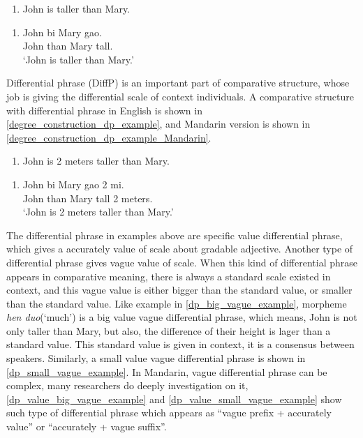 \documentclass{ctexart}
\let \cite \parencite
\begin{document}
\begin{enumerate}
    \item \label{degree_construction_example}
    John is taller than Mary.
\end{enumerate}

\begin{enumerate}
    \item \label{degree_construction_example_Mandarin}
    John bi Mary gao.  \\
    John than Mary tall. \\
    `John is taller than Mary.'
\end{enumerate}

Differential phrase (DiffP) is an important part of comparative structure, whose job is giving the differential scale of context individuals. A comparative structure with differential phrase in English is shown in \ref{degree_construction_dp_example}, and Mandarin version is shown in \ref{degree_construction_dp_example_Mandarin}.

\begin{enumerate}
    \item \label{degree_construction_dp_example}
    John is 2 meters taller than Mary.
\end{enumerate}

\begin{enumerate}
    \item \label{degree_construction_dp_example_Mandarin}
    John bi Mary gao 2 mi.  \\
    John than Mary tall 2 meters. \\
    `John is 2 meters taller than Mary.'
\end{enumerate}

The differential phrase in examples above are specific value differential phrase, which gives a accurately value of scale about gradable adjective. Another type of differential phrase gives vague value of scale. When this kind of differential phrase appears in comparative meaning, there is always a standard scale existed in context, and this vague value is either bigger than the standard value, or smaller than the standard value. Like example in \ref{dp_big_vague_example}, morpheme \textit{hen duo}(`much') is a big value vague differential phrase, which means, John is not only taller than Mary, but also, the difference of their height is lager than a standard value. This standard value is given in context, it is a consensus between speakers. Similarly, a small value vague differential phrase is shown in \ref{dp_small_vague_example}. In Mandarin, vague differential phrase can be complex, many researchers \cite{lin2014,li2015} do deeply investigation on it, \ref{dp_value_big_vague_example} and \ref{dp_value_small_vague_example} show such type of differential phrase which appears as ``vague prefix + accurately value'' or ``accurately + vague suffix''.
\end{document}

